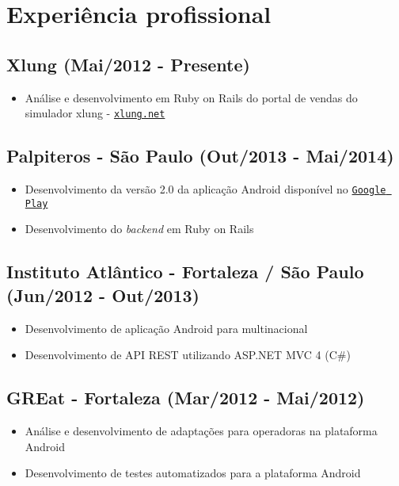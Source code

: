 \documentclass[11pt]{article}
\begin{document}
\section*{Experiência profissional}
{\addtolength{\leftskip}{3.5mm}

\subsection*{Xlung (Mai/2012 - Presente)}
\begin{itemize}
\item Análise e desenvolvimento em Ruby on Rails do portal de vendas do simulador xlung - \href{http://xlung.net}{\tt xlung.net}
\end{itemize}

\subsection*{Palpiteros - São Paulo (Out/2013 - Mai/2014)}
\begin{itemize}
\item Desenvolvimento da versão 2.0 da aplicação Android disponível no \href{https://play.google.com/store/apps/details?id=com.blissapplications.palpiteros}{\tt Google Play}
\item Desenvolvimento do \textit{backend} em Ruby on Rails
\end{itemize}

\subsection*{Instituto Atlântico - Fortaleza / São Paulo (Jun/2012 - Out/2013)}
\begin{itemize}
\item Desenvolvimento de aplicação Android para multinacional
\item Desenvolvimento de API REST utilizando ASP.NET MVC 4 (C\#)
\end{itemize}

\subsection*{GREat - Fortaleza (Mar/2012 - Mai/2012)}
\begin{itemize}
\item Análise e desenvolvimento de adaptações para operadoras na plataforma Android
\item Desenvolvimento de testes automatizados para a plataforma Android
\end{itemize}

}
\end{document}
